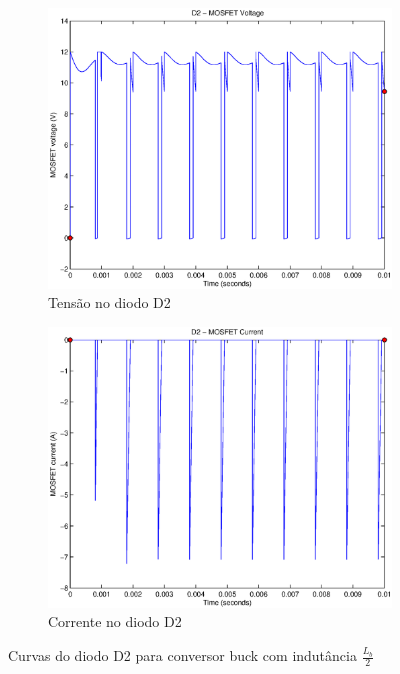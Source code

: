 \documentclass{article}
\begin{document}
\begin{figure}[H]
	\centering
	\begin{subfigure}[b]{0.4\linewidth}
		\includegraphics[width=\linewidth]{matlab/buck/r_d2v2}
		\caption{Tensão no diodo D2}
	\end{subfigure}
	\begin{subfigure}[b]{0.4\linewidth}
		\centering
		\includegraphics[width=\linewidth]{matlab/buck/r_d2i2}
		\caption{Corrente no diodo D2}
	\end{subfigure}
	\caption{Curvas do diodo D2 para conversor buck com indutância $\frac{L_b}{2}$}
	\label{fig:bd22}
\end{figure}
\end{document}
